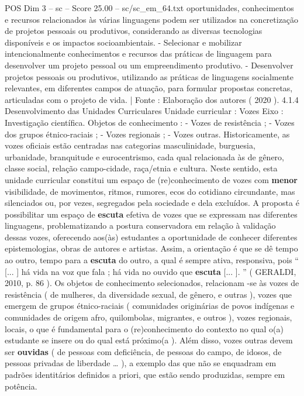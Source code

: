 \begin{textsample}{POS Dim 3 – sc – Score 25.00 – sc/sc\_em\_64.txt}
oportunidades, conhecimentos e recursos relacionados às várias linguagens podem ser utilizados na concretização de projetos pessoais ou produtivos, considerando as diversas tecnologias disponíveis e os impactos socioambientais. - Selecionar e mobilizar intencionalmente conhecimentos e recursos das práticas de linguagem para desenvolver um projeto pessoal ou um empreendimento produtivo. - Desenvolver projetos pessoais ou produtivos, utilizando as práticas de linguagens socialmente relevantes, em diferentes campos de atuação, para formular propostas concretas, articuladas com o projeto de vida. | Fonte : Elaboração dos autores ( 2020 ). 4.1.4 Desenvolvimento das Unidades Curriculares Unidade curricular : Vozes Eixo : Investigação científica.
Objetos de conhecimento : - Vozes de resistência ; - Vozes dos grupos étnico-raciais ; - Vozes regionais ; - Vozes outras.
Historicamente, as vozes oficiais estão centradas nas categorias masculinidade, burguesia, urbanidade, branquitude e eurocentrismo, cada qual relacionada às de gênero, classe social, relação campo-cidade, raça/etnia e cultura.
Neste sentido, esta unidade curricular constitui um espaço de (re)conhecimento de vozes com \textbf{menor} visibilidade, de movimentos, ritmos, rumores, ecos do cotidiano circundante, mas silenciados ou, por vezes, segregados pela sociedade e dela excluídos.
A proposta é possibilitar um espaço de \textbf{escuta} efetiva de vozes que se expressam nas diferentes linguagens, problematizando a postura conservadora em relação à validação dessas vozes, oferecendo aos(às) estudantes a oportunidade de conhecer diferentes epistemologias, obras de autores e artistas.
Assim, a orientação é que se dê tempo ao outro, tempo para a \textbf{escuta} do outro, a qual é sempre ativa, responsiva, pois “ [... ] há vida na voz que fala ; há vida no ouvido que \textbf{escuta} [... ]. ” ( GERALDI, 2010, p. 86 ).
Os objetos de conhecimento selecionados, relacionam -se às vozes de resistência ( de mulheres, da diversidade sexual, de gênero, e outras ), vozes que emergem de grupos étnico-raciais ( comunidades originárias de povos indígenas e comunidades de origem afro, quilombolas, migrantes, e outros ), vozes regionais, locais, o que é fundamental para o (re)conhecimento do contexto no qual o(a) estudante se insere ou do qual está próximo(a ).
Além disso, vozes outras devem ser \textbf{ouvidas} ( de pessoas com deficiência, de pessoas do campo, de idosos, de pessoas privadas de liberdade … ), a exemplo das que não se enquadram em padrões identitários definidos a priori, que estão sendo produzidas, sempre em potência.

\end{textsample}
